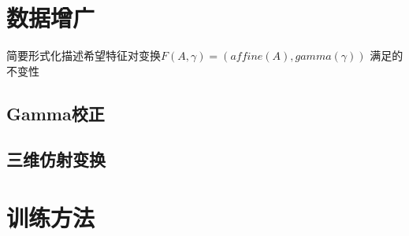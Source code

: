 \section{数据增广}
简要形式化描述希望特征对变换$F(A, \gamma)=(affine(A), gamma(\gamma))$
满足的不变性

\subsection{Gamma校正}

\subsection{三维仿射变换}

\section{训练方法}


